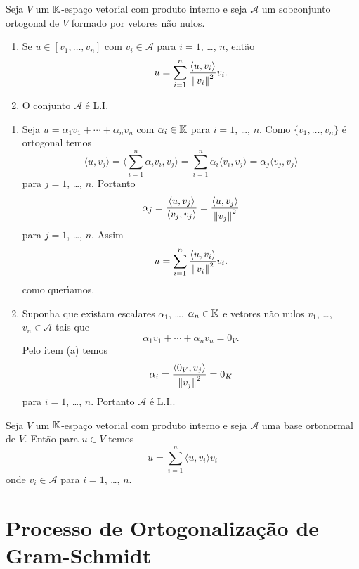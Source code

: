\begin{proposicao}\label{ortogonalLI}
	Seja $V$ um $\mathbb{K}$-espa\c{c}o vetorial com produto interno e seja $\mathcal{A}$ um sobconjunto ortogonal de $V$ formado por vetores n\~ao nulos.
	\begin{enumerate}[label=({\alph*})]
		\item Se $u \in [v_1, \dots, v_n]$ com $v_i \in \mathcal{A}$ para $i = 1$, \dots, $n$, ent\~ao
		\[
			u = \sum_{i = 1}^n \dfrac{\langle u, v_i \rangle}{\left\lVert v_i\right\rVert^2}v_i.
		\]
		\item O conjunto $\mathcal{A}$ \'e L.I.
	\end{enumerate}
\end{proposicao}
\begin{prova}
	\begin{enumerate}[label=({\alph*})]
		\item  Seja $u = \alpha_1 v_1 + \cdots + \alpha_n v_n$ com $\alpha_i \in \mathbb{K}$ para $i = 1$, \dots, $n$. Como $\{v_1, \dots, v_n\}$ \'e ortogonal temos
		\[
			\langle u, v_j \rangle = \langle \sum_{i = 1}^n\alpha_i v_i, v_j \rangle = \sum_{i = 1}^n \alpha_i\langle v_i, v_j \rangle = \alpha_j \langle v_j, v_j \rangle
		\]
		para $j = 1$, \dots, $n$. Portanto
		\[
			\alpha_j = \dfrac{\langle u, v_j \rangle}{\langle v_j, v_j \rangle} = \dfrac{\langle u, v_j \rangle}{\left\lVert v_j\right\rVert^2}
		\]
		para $j = 1$, \dots, $n$. Assim
		\[
			u = \sum_{i = 1}^n \dfrac{\langle u, v_i \rangle}{\left\lVert v_i\right\rVert^2}v_i.
		\]
		como quer{\'\i}amos.
		\item Suponha que existam escalares $\alpha_1$, \dots, $\alpha_n \in \mathbb{K}$ e vetores n\~ao nulos $v_1$, \dots, $v_n \in \mathcal{A}$ tais que
		\[
			\alpha_1 v_1 + \cdots + \alpha_n v_n = 0_V.
		\]
		Pelo item (a) temos
		\[
			\alpha_i = \dfrac{\langle 0_V, v_j \rangle}{\left\lVert v_j\right\rVert^2} = 0_K
		\]
		para $i = 1$, \dots, $n$. Portanto $\mathcal{A}$ \'e L.I..
	\end{enumerate}
\end{prova}

\begin{corolario}
	Seja $V$ um $\mathbb{K}$-espa\c{c}o vetorial com produto interno e seja $\mathcal{A}$ uma base ortonormal de $V$. Ent\~ao para $u \in V$ temos
	\[
		u = \sum_{i = 1}^n \langle u, v_i\rangle v_i
	\]
	onde $v_i \in \mathcal{A}$ para $i = 1$, \dots, $n$.
\end{corolario}

\section{Processo de Ortogonaliza\c{c}\~ao de Gram-Schmidt} %
\label{sec:processo_de_ortogonaliza_cao_de_gram_schmidt}

